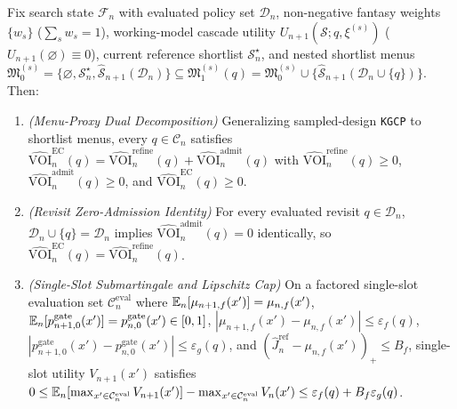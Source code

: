 \begin{theorem}\label{thm:eckg_dual_voi}\label{thm:sequential_bgpkg}
Fix search state $\mathcal{F}_n$ with evaluated policy set $\mathcal{D}_n$, non-negative fantasy weights $\{w_s\}$ ($\sum_s w_s = 1$), working-model cascade utility $U_{n+1}(\mathcal{S}; q, \xi^{(s)})$ ($U_{n+1}(\varnothing) \equiv 0$), current reference shortlist $\mathcal{S}_n^\star$, and nested shortlist menus $\mathfrak{M}_0^{(s)} = \{\varnothing, \mathcal{S}_n^\star, \hat{\mathcal{S}}_{n+1}(\mathcal{D}_n)\} \subseteq \mathfrak{M}_1^{(s)}(q) = \mathfrak{M}_0^{(s)} \cup \{\hat{\mathcal{S}}_{n+1}(\mathcal{D}_n \cup \{q\})\}$. Then:
\begin{enumerate}
  \item \emph{(Menu-Proxy Dual Decomposition)} Generalizing sampled-design \texttt{KGCP} \citep{scott2011correlated} to shortlist menus, every $q \in \mathcal{C}_n$ satisfies $\widehat{\mathrm{VOI}}_n^{\mathrm{EC}}(q) = \widehat{\mathrm{VOI}}_n^{\mathrm{refine}}(q) + \widehat{\mathrm{VOI}}_n^{\mathrm{admit}}(q)$ with $\widehat{\mathrm{VOI}}_n^{\mathrm{refine}}(q) \ge 0$, $\widehat{\mathrm{VOI}}_n^{\mathrm{admit}}(q) \ge 0$, and $\widehat{\mathrm{VOI}}_n^{\mathrm{EC}}(q) \ge 0$.
  \item \emph{(Revisit Zero-Admission Identity)} For every evaluated revisit $q \in \mathcal{D}_n$, $\mathcal{D}_n \cup \{q\} = \mathcal{D}_n$ implies $\widehat{\mathrm{VOI}}_n^{\mathrm{admit}}(q) = 0$ identically, so $\widehat{\mathrm{VOI}}_n^{\mathrm{EC}}(q) = \widehat{\mathrm{VOI}}_n^{\mathrm{refine}}(q)$.
  \item \emph{(Single-Slot Submartingale and Lipschitz Cap)} On a factored single-slot evaluation set $\mathcal{C}_n^{\mathrm{eval}}$ where $\mathbb{E}_n[\mu_{n+1,f}(x')] = \mu_{n,f}(x')$, $\mathbb{E}_n[p_{n+1,0}^{\mathrm{gate}}(x')] = p_{n,0}^{\mathrm{gate}}(x') \in [0,1]$, $|\mu_{n+1,f}(x')-\mu_{n,f}(x')| \le \varepsilon_f(q)$, $|p_{n+1,0}^{\mathrm{gate}}(x')-p_{n,0}^{\mathrm{gate}}(x')| \le \varepsilon_g(q)$, and $(\hat{J}_n^{\mathrm{ref}} - \mu_{n,f}(x'))_+ \le B_f$, single-slot utility $V_{n+1}(x')$ satisfies $0 \le \mathbb{E}_n[\max_{x' \in \mathcal{C}_n^{\mathrm{eval}}} V_{n+1}(x')] - \max_{x' \in \mathcal{C}_n^{\mathrm{eval}}} V_n(x') \le \varepsilon_f(q) + B_f\varepsilon_g(q)$.
\end{enumerate}
\end{theorem}

